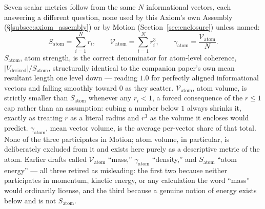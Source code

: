 \documentclass[12pt, a4paper]{article}
\begin{document}
Seven scalar metrics follow from the same $N$ informational vectors,
each answering a different question, none used by this Axiom's own
Assembly (\S\ref{subsec:axiom_assembly}) or by Motion
(Section~\ref{sec:enclosure}) unless named:
\[
S_{\text{atom}} = \sum_{i=1}^N r_i, \qquad
\mathcal{V}_{\text{atom}} = \sum_{i=1}^N r_i^3, \qquad
\gamma_{\text{atom}} = \frac{\mathcal{V}_{\text{atom}}}{N}.
\]
$S_{\text{atom}}$, atom strength, is the correct denominator for
atom-level coherence, $\lvert V_{\text{derived}}\rvert /
S_{\text{atom}}$, structurally identical to the companion paper's own
mean resultant length one level down --- reading $1.0$ for perfectly
aligned informational vectors and falling smoothly toward $0$ as they
scatter. $\mathcal{V}_{\text{atom}}$, atom volume, is strictly
smaller than $S_{\text{atom}}$ whenever any $r_i<1$, a forced
consequence of the $r\le 1$ cap rather than an assumption: cubing a
number below $1$ always shrinks it, exactly as treating $r$ as a
literal radius and $r^3$ as the volume it encloses would predict.
$\gamma_{\text{atom}}$, mean vector volume, is the average per-vector
share of that total. None of the three participates in Motion; atom
volume, in particular, is deliberately excluded from it and exists
here purely as a descriptive metric of the atom. Earlier drafts
called $\mathcal{V}_{\text{atom}}$ ``mass,'' $\gamma_{\text{atom}}$
``density,'' and $S_{\text{atom}}$ ``atom energy'' --- all three
retired as misleading: the first two because neither participates in
momentum, kinetic energy, or any calculation the word ``mass'' would
ordinarily license, and the third because a genuine notion of energy
exists below and is not $S_{\text{atom}}$.
\end{document}

